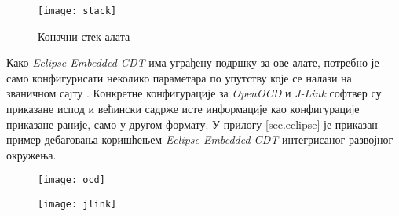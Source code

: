 \begin{figure}[h!]
	\centering
	\texttt{[image: stack]}
	\caption{Коначни стек алата}
	\label{fig:stack}
\end{figure}

Како \textit{Eclipse Embedded CDT} има уграђену подршку за ове алате, потребно је само конфигурисати неколико параметара по упутству које се налази на званичном сајту \cite{embcdt}.
Конкретне конфигурације за \textit{Open\acrshort{OCD}} и \textit{J-Link} софтвер су приказане испод и већински садрже исте информације као конфигурације приказане раније, само у другом формату. У прилогу \ref{sec.eclipse} је приказан пример дебаговања коришћењем \textit{Eclipse Embedded CDT} интегрисаног развојног окружења.

\begin{figure}
	\centering
	\begin{minipage}{.5\textwidth}
		\centering
		\texttt{[image: ocd]}
		\label{fig:ocd}
	\end{minipage}%
	\begin{minipage}{.5\textwidth}
		\centering
		\texttt{[image: jlink]}
		\label{fig:jlink}
	\end{minipage}
\end{figure}

